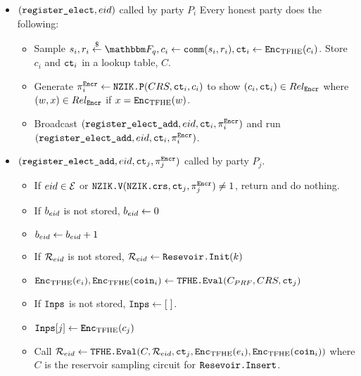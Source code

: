 \begin{mdframed}
\begin{itemize}
		\item $(\texttt{register\_elect}, {eid})$ called by party $P_i$
		      Every honest party does the following:
		      \begin{itemize}
						\item Sample $s_i, r_i \randomGet \F_q, c_i \gets \comm(s_i, r_i), \ct_i \gets \Enc(c_i)$.
						Store $c_i$ and $\texttt{ct}_i$ in a lookup table, $C$.
						\item Generate $\pi_{i}^{\texttt{Encr}} \gets \texttt{NZIK.P}(CRS, \texttt{ct}_i, c_i)$ to show $(c_i, \texttt{ct}_i) \in Rel_\texttt{Encr}$ where $(w, x) \in Rel_\texttt{Encr}$ if $x = \texttt{Enc}_{\mathrm{TFHE}}(w)$.
						\item Broadcast $(\texttt{register\_elect\_add}, {eid}, \texttt{ct}_i, \pi_{i}^{\texttt{Encr}})$ and run \\$(\texttt{register\_elect\_add}, {eid}, \texttt{ct}_i, \pi_{i}^{\texttt{Encr}})$.
		      \end{itemize}
		
		\item $(\texttt{register\_elect\_add}, {eid}, \texttt{ct}_j, \pi_{j}^{\texttt{Encr}})$ called by party $P_j$.
					\begin{itemize}
			      \item If ${eid} \in \mathcal{E}$ or $\texttt{NZIK.V}(\texttt{NZIK.crs}, \texttt{ct}_j, \pi_{j}^{\texttt{Encr}}) \neq 1$, return and do nothing.
						\item If $b_{eid}$ is not stored, $b_{eid} \gets 0$
						\item $b_{eid} \gets b_{eid} + 1$
						\item If $\mathcal{R}_{eid}$ is not stored, $\mathcal{R}_{eid} \gets \texttt{Resevoir.Init}(k)$
						\item $\texttt{Enc}_{\mathrm{TFHE}}(e_i), \texttt{Enc}_{\mathrm{TFHE}}(\texttt{coin}_i) \gets \texttt{TFHE.Eval}(C_{PRF}, CRS, \texttt{ct}_j)$
			      \item If $\texttt{Inps}$ is not stored, $\texttt{Inps} \gets [\;]$. 
						\item $\texttt{Inps}[j] \gets \texttt{Enc}_{\mathrm{TFHE}}(c_j)$
					  \item Call $\mathcal{R}_{eid} \gets \texttt{TFHE.Eval}(C, \mathcal{R}_{eid}, \texttt{ct}_j, \texttt{Enc}_{\mathrm{TFHE}}(e_i), \texttt{Enc}_{\mathrm{TFHE}}(\texttt{coin}_i))$ where
					        $C$ is the reservoir sampling circuit for $\texttt{Resevoir.Insert}$. %
					\end{itemize}


\end{itemize}
\end{mdframed}
